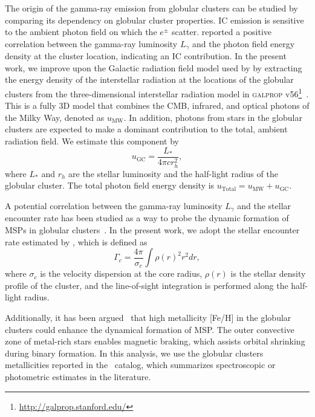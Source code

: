 \documentclass[doublespace,nopageskip]{VTthesis}
\begin{document}
The origin of the gamma-ray emission from globular clusters can be studied by comparing its dependency on globular cluster properties. IC emission is sensitive to the ambient photon field on which the $e^\pm$ scatter. \citet{2011ApJ...726..100H} reported a positive correlation between the gamma-ray luminosity $L_\gamma$ and the photon field energy density at the cluster location, indicating an IC contribution. In the present work, we improve upon the Galactic radiation field model used by \citet{2011ApJ...726..100H} by extracting the energy density of the interstellar radiation at the locations of the globular clusters from the three-dimensional interstellar radiation model in \textsc{galprop} v56\footnote{\url{http://galprop.stanford.edu/}}~\citep{2017ApJ...846...67P,2018ApJ...856...45J}. This is a fully 3D model that combines the CMB, infrared, and optical photons of the Milky Way, denoted as $u_\text{MW}$. In addition, photons from stars in the globular clusters are expected to make a dominant contribution to the total, ambient radiation field. We estimate this component by
\begin{equation}
    u_{\text{GC}} = \dfrac{L_*}{4\pi c r_h^2},
    \label{eq:GCRF}
\end{equation}
where $L_*$ and $r_h$ are the stellar luminosity and the half-light radius of the globular cluster. The total photon field energy density is $u_\text{Total} = u_\text{MW} + u_\text{GC}$.

A potential correlation between the gamma-ray luminosity $L_\gamma$ and the stellar encounter rate has been studied as a way to probe the dynamic formation of MSPs in globular clusters~\citep{2010A&A...524A..75A,2011ApJ...726..100H,2019MNRAS.486..851D}. In the present work, we adopt the stellar encounter rate estimated by \citet{2013ApJ...766..136B}, which is defined as
\begin{equation}
    \Gamma_c = \frac{4\pi}{\sigma_c}\int\rho(r)^2 r^2dr,
	\label{eq:encounter}
\end{equation}
where $\sigma_c$ is the velocity dispersion at the core radius, $\rho(r)$ is the stellar density profile of the cluster, and the line-of-sight integration is performed along the half-light radius. 

Additionally, it has been argued~\citep{2011ApJ...726..100H,2019MNRAS.486..851D} that high metallicity [Fe/H] in the globular clusters could enhance the dynamical formation of MSP. The outer convective zone of metal-rich stars enables magnetic braking, which assists orbital shrinking during binary formation. In this analysis, we use the globular clusters metallicities  reported in the~\citet{1996AJ....112.1487H} catalog, which summarizes  spectroscopic or photometric estimates in the literature.
\end{document}
